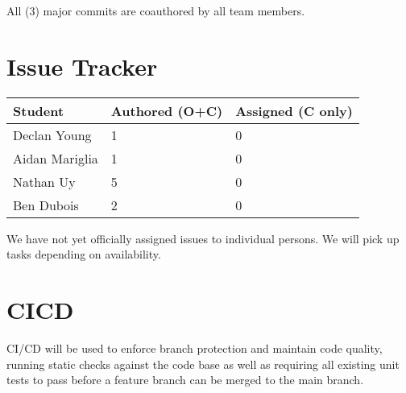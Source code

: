 \documentclass{article}
\begin{document}
All (3) major commits are coauthored by all team members.

\section{Issue Tracker}

\begin{table}[H]
\centering
\begin{tabular}{lll}
\toprule
\textbf{Student} & \textbf{Authored (O+C)} & \textbf{Assigned (C only)}\\
\midrule
Declan Young & 1 & 0 \\
Aidan Mariglia & 1 & 0 \\
Nathan Uy & 5 & 0 \\
Ben Dubois & 2 & 0 \\
\bottomrule
\end{tabular}
\end{table}

We have not yet officially assigned issues to individual persons. We will pick up tasks depending on availability.

\section{CICD}

CI/CD will be used to enforce branch protection and maintain code quality, running static checks against the code base as well as requiring all existing unit tests to pass before a feature branch can be merged to the main branch.
\end{document}
